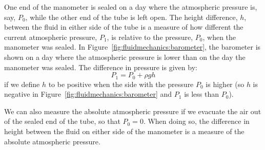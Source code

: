 One end of the manometer is sealed on a day where the atmospheric pressure is, say, $P_0$, while the other end of the tube is left open. The height difference, $h$, between the fluid in either side of the tube is a measure of how different the current atmospheric pressure, $P_1$, is relative to the pressure, $P_0$, when the manometer was sealed. In Figure~\ref{fig:fluidmechanics:barometer}, the barometer is shown on a day where the atmospheric pressure is lower than on the day the manometer was sealed. The difference in pressure is given by:
\begin{equation}
P_1 = P_0 + \rho g h
\end{equation}
if we define $h$ to be positive when the side with the pressure $P_0$ is higher (so $h$ is negative in Figure~\ref{fig:fluidmechanics:barometer} and $P_1$ is less than $P_0$).

We can also measure the absolute atmospheric pressure if we evacuate the air out of the sealed end of the tube, so that $P_0=0$. When doing so, the difference in height between the fluid on either side of the manometer is a measure of the absolute atmospheric pressure.


